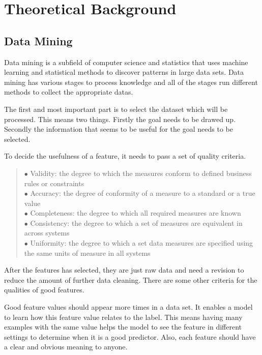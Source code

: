 \chapter{Theoretical Background}

\section{Data Mining}

Data mining is a subfield of computer science and statistics that uses machine learning and statistical methods to discover patterns in large data sets. Data mining has various stages to process knowledge and all of the stages run different methods to collect the appropriate datas.\medskip

The first and most important part is to select the dataset which will be processed. This means two things. Firstly the goal needs to be drawed up. Secondly the information that seems to be useful for the goal needs to be selected. \smallskip

\noindent To decide the usefulness of a feature, it needs to pass a set of quality criteria.
\begin{verse}
	$\bullet$ Validity: the degree to which the measures conform to defined business rules or constraints\\
	$\bullet$ Accuracy: the degree of conformity of a measure to a standard or a true value\\
	$\bullet$ Completeness: the degree to which all required measures are known\\
	$\bullet$ Consistency: the degree to which a set of measures are equivalent in across systems\\
	$\bullet$ Uniformity: the degree to which a set data measures are specified using the same units of measure in all systems
\end{verse}

After the features has selected, they are just raw data and need a revision to reduce the amount of further data cleaning. There are some other criteria for the qualities of good features. \smallskip

Good feature values should appear more times in a data set. It enables a model to learn how this feature value relates to the label. This means having many examples with the same value helps the model to see the feature in different settings to determine when it is a good predictor. Also, each feature should have a clear and obvious meaning to anyone. 


